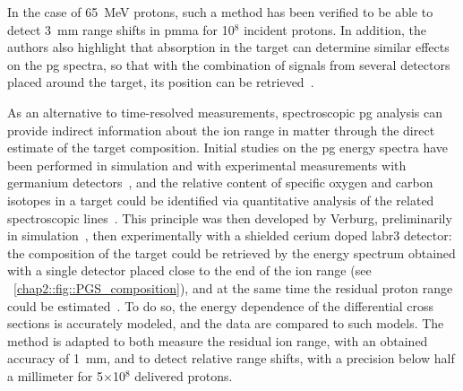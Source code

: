 In the case of 65~MeV protons, such a method has been verified to be able to detect 3~mm range shifts in \gls{pmma} for 10$^8$ incident protons. In addition, the authors also highlight that absorption in the target can determine similar effects on the \gls{pg} spectra, so that with the combination of signals from several detectors placed around the target, its position can be retrieved~\parencite{Krimmer2017b}.

As an alternative to time-resolved measurements, spectroscopic \gls{pg} analysis can provide indirect information about the ion range in matter through the direct estimate of the target composition. Initial studies on the \gls{pg} energy spectra have been performed in simulation and with experimental measurements with germanium detectors~\parencite{Polf2009, Polf2009b}, and the relative content of specific oxygen and carbon isotopes in a target could be identified via quantitative analysis of the related spectroscopic lines~\parencite{Polf2013}. This principle was then developed by Verburg, preliminarily in simulation~\parencite{Verburg2012}, then experimentally with a shielded cerium doped \gls{labr3} detector: the composition of the target could be retrieved by the energy spectrum obtained with a single detector placed close to the end of the ion range (see \figurename~\ref{chap2::fig::PGS_composition}), and at the same time the residual proton range could be estimated~\parencite{Verburg2013, Verburg2014}. To do so, the energy dependence of the differential cross sections is accurately modeled, and the data are compared to such models. The method is adapted to both measure the residual ion range, with an obtained accuracy of 1~mm, and to detect relative range shifts, with a precision below half a millimeter for 5$\times$10$^8$ delivered protons. 

